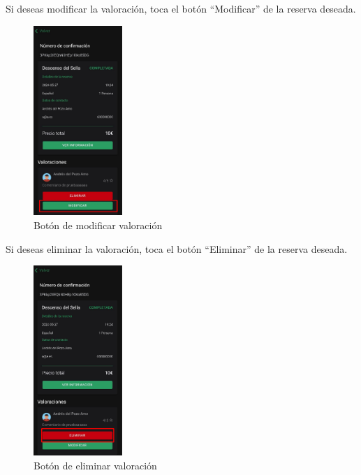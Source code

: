 Si deseas modificar la valoración, toca el botón “Modificar” de la reserva deseada.
\begin{figure}[H]
	\centering
	\includegraphics[width=0.3\textwidth]{7-Construccion/Manuales/app/P5-Publicar.png}
	\caption{Botón de modificar valoración}
\end{figure}
Si deseas eliminar la valoración, toca el botón “Eliminar” de la reserva deseada.
\begin{figure}[H]
	\centering
	\includegraphics[width=0.3\textwidth]{7-Construccion/Manuales/app/P6-Publicar.png}
	\caption{Botón de eliminar valoración}
\end{figure}


